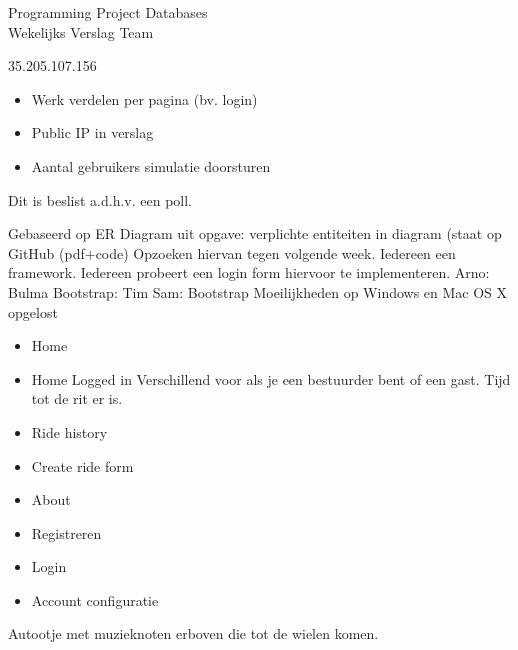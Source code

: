 \documentclass{article}
\newcounter{team}
\begin{document}
	
	\begin{Minutes}{Programming Project Databases \\ Wekelijks Verslag Team }
		\missingNoExcuse{/}
		\missingExcused{/}
		
		\maketitle
		
			35.205.107.156		
		\begin{itemize}
			\item Werk verdelen per pagina (bv. login)
			\item Public IP in verslag
			\item Aantal gebruikers simulatie doorsturen 
		\end{itemize}
		
			

			
					Dit is beslist a.d.h.v. een poll.
					\begin{Vote}
					\end{Vote}
					
					Gebaseerd op ER Diagram uit opgave: verplichte entiteiten in diagram (staat op GitHub (pdf+code)
							Opzoeken hiervan tegen volgende week. Iedereen een framework. Iedereen probeert een login form hiervoor te implementeren.
							Arno: Bulma
							Bootstrap: Tim
							Sam: Bootstrap
					Moeilijkheden op Windows en Mac OS X opgelost
					\begin{itemize}
						\item Home
						\item Home Logged in
							Verschillend voor als je een bestuurder bent of een gast. Tijd tot de rit er is. 
						\item Ride history	
						\item Create ride form
						\item About
						\item Registreren
						\item Login 
						\item Account configuratie
					\end{itemize}
					Autootje met muzieknoten erboven die tot de wielen komen.
					

\end{Minutes}
\end{document}
